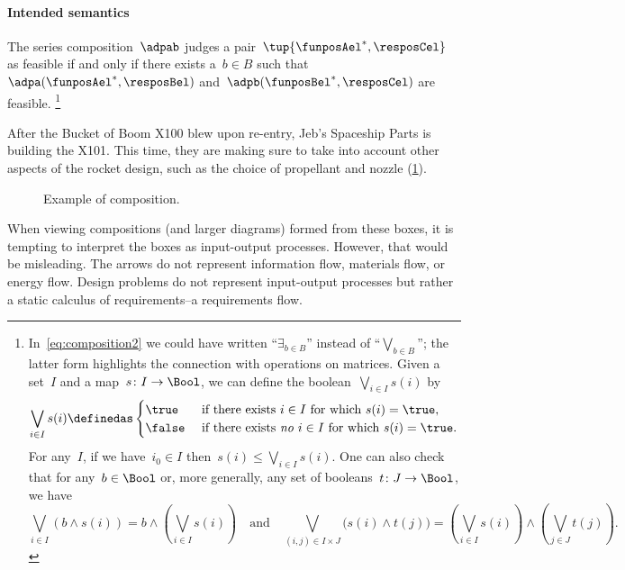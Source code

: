 \paragraph{Intended semantics}
The series composition~$\adpab$ judges a pair~$\tup{\funposAel^*,\resposCel}$ as feasible if and only if there exists a~$b \in B$ such that~$\adpa(\funposAel^*,\resposBel)$ and~$\adpb(\funposBel^*,\resposCel)$ are feasible.
\footnote{In~\cref{eq:composition2} we could have written ``$\exists_{b\in B}$'' instead of ``$\bigvee_{b\in B}$''; the latter form highlights the connection with operations on matrices.
Given a set~$I$ and a map~$s\colon I\to\Bool$, we can define the boolean~$\bigvee_{i\in I}s(i)$ by
  \begin{equation*}
    \bigvee_{i\in I}s(i)\definedas
    \begin{cases}
      \true&\text{ if there exists }i\in I\text{ for which }s(i)=\true,\\
      \false&\text{ if there exists \emph{no} }i\in I\text{ for which }s(i)=\true.
    \end{cases}
  \end{equation*}
  For any~$I$, if we have~$i_0\in I$ then~$s(i)\leq\bigvee_{i\in I}s(i)$. One can also check that for any~$b\in\Bool$ or, more generally, any set of booleans~$t\colon J\to\Bool$, we have
  \begin{equation*}
    \bigvee_{i\in I}(b\wedge s(i))=b\wedge\left(\bigvee_{i\in I}s(i)\right)
    \quad\text{and}\quad
    \bigvee_{(i,j)\in I\times  J}\big(s(i)\wedge t(j)\big)=\left(\bigvee_{i\in I}s(i)\right)\wedge\left(\bigvee_{j\in J} t(j)\right).
  \end{equation*}
}

\begin{example}
  After the Bucket of Boom X100 blew upon re-entry, Jeb's Spaceship Parts is building the X101. This time, they are making sure to take into account other aspects of the rocket design, such as the choice of propellant and nozzle (\cref{fig:examplecomposition}).
  \begin{figure}[h!]
    \begin{center}
    \end{center}
    \caption{Example of composition. \label{fig:examplecomposition}}
  \end{figure}
\end{example}

\begin{remark}
  When viewing compositions (and larger diagrams) formed from these boxes, it is tempting to interpret the boxes as input-output processes.
  However, that would be misleading. The arrows do not represent information flow, materials flow, or energy flow.
  Design problems do not represent input-output processes but rather a static calculus of requirements--a requirements flow.
\end{remark}

